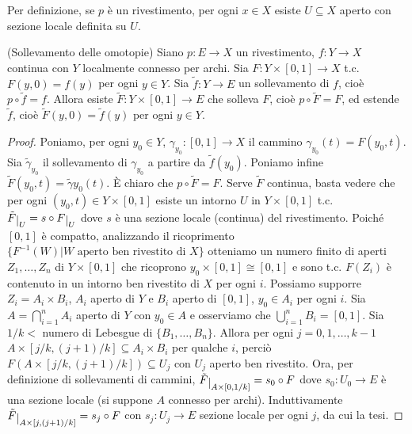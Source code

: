 \begin{oss}
  Per definizione, se $p$ è un rivestimento, per ogni $x \in X$ esiste $U \subseteq X$ aperto con sezione locale definita su $U$.
\end{oss}

\begin{thm} \label{soll_omo}
  (Sollevamento delle omotopie) Siano $p:E \rightarrow X$ un rivestimento, $f:Y \rightarrow X$ continua con $Y$ localmente connesso per archi. Sia $F:Y \times[0, 1] \rightarrow X$ t.c. $F(y, 0)=f(y)$ per ogni $y \in Y$. Sia $\tilde{f}:Y \rightarrow E$ un sollevamento di $f$, cioè $p \circ \tilde{f}=f$.
  Allora esiste $\tilde{F}:Y \times [0, 1] \rightarrow E$ che solleva $F$, cioè $p \circ \tilde{F}=F$, ed estende $\tilde{f}$, cioè $\tilde{F}(y, 0)=\tilde{f}(y)$ per ogni $y \in Y$.
\end{thm}

\begin{proof}
  Poniamo, per ogni $y_0 \in Y$, $\gamma_{y_0}:[0, 1] \rightarrow X$ il cammino $\gamma_{y_0}(t)=F(y_0, t)$. Sia $\tilde{\gamma}_{y_0}$ il sollevamento di $\gamma_{y_0}$ a partire da $\tilde{f}(y_0)$. Poniamo infine $\tilde{F}(y_0, t)=\tilde{\gamma}{y_0}(t)$.
  È chiaro che $p \circ \tilde{F}=F$. Serve $\tilde{F}$ continua, basta vedere che per ogni $(y_0, t) \in Y \times [0, 1]$ esiste un intorno $U$ in $Y \times [0, 1]$ t.c. $\tilde{F}\restrict{U}=s \circ F\restrict{U}$ dove $s$ è una sezione locale (continua) del rivestimento.
  Poiché $[0, 1]$ è compatto, analizzando il ricoprimento $\{F^{-1}(W) | W \text{ aperto ben rivestito di } X\}$ otteniamo un numero finito di aperti $Z_1, \dots, Z_n$ di $Y \times [0, 1]$ che ricoprono $y_0 \times [0, 1] \cong [0, 1]$ e sono t.c. $F(Z_i)$ è contenuto in un intorno ben rivestito di $X$ per ogni $i$.
  Possiamo supporre $Z_i=A_i \times B_i$, $A_i$ aperto di $Y$ e $B_i$ aperto di $[0, 1]$, $y_0 \in A_i$ per ogni $i$. Sia $A= \bigcap_{i=1}^n A_i$ aperto di $Y$ con $y_0 \in A$ e osserviamo che $\bigcup_{i=1}^n B_i=[0, 1]$.
  Sia $1/k<$ numero di Lebesgue di $\{B_1, \dots, B_n\}$. Allora per ogni $j=0, 1, \dots, k-1$ $A \times [j/k, (j+1)/k] \subseteq A_i \times B_i$ per qualche $i$, perciò $F(A \times [j/k, (j+1)/k]) \subseteq U_j$ con $U_j$ aperto ben rivestito.
  Ora, per definizione di sollevamenti di cammini, $\tilde{F} \restrict{A \times [0, 1/k]}=s_0 \circ F$ dove $s_0: U_0 \rightarrow E$ è una sezione locale (si suppone $A$ connesso per archi). Induttivamente $\tilde{F} \restrict{A \times [j, (j+1)/k]}=s_j \circ F$ con $s_j: U_j \rightarrow E$ sezione locale per ogni $j$, da cui la tesi.
\end{proof}

